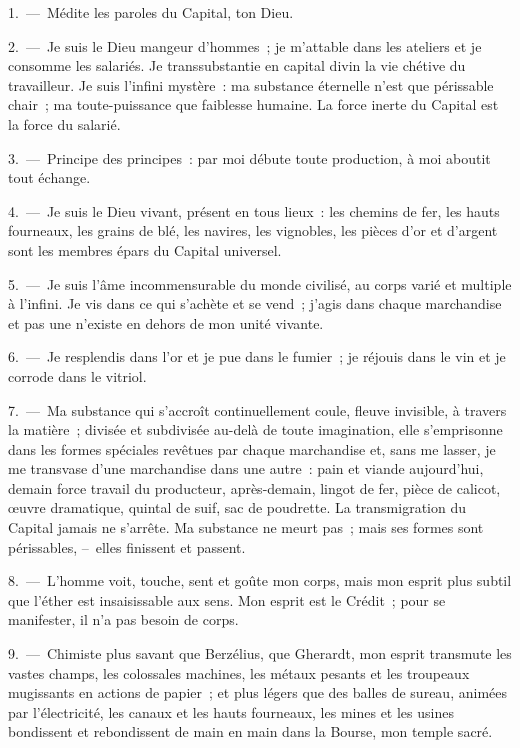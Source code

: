 \documentclass[french,twoside]{book} %
\begin{document}
1. — Médite les paroles du Capital, ton Dieu.\par
2. — Je suis le Dieu mangeur d’hommes ; je m’attable dans les ateliers et je consomme les salariés. Je transsubstantie en capital divin la vie chétive du travailleur. Je suis l’infini mystère : ma substance éternelle n’est que périssable chair ; ma toute-puissance que faiblesse humaine. La force inerte du Capital est la force du salarié.\par
3. — Principe des principes : par moi débute toute production, à moi aboutit tout échange.\par
4. — Je suis le Dieu vivant, présent en tous lieux : les chemins de fer, les hauts fourneaux, les grains de blé, les navires, les vignobles, les pièces d’or et d’argent sont les membres épars du Capital universel.\par
5. — Je suis l’âme incommensurable du monde civilisé, au corps varié et multiple à l’infini. Je vis dans ce qui s’achète et se vend ; j’agis dans chaque marchandise et pas une n’existe en dehors de mon unité vivante.\par
6. — Je resplendis dans l’or et je pue dans le fumier ; je réjouis dans le vin et je corrode dans le vitriol.\par
7. — Ma substance qui s’accroît continuellement coule, fleuve invisible, à travers la matière ; divisée et subdivisée au-delà de toute imagination, elle s’emprisonne dans les formes spéciales revêtues par chaque marchandise et, sans me lasser, je me transvase d’une marchandise dans une autre : pain et viande aujourd’hui, demain force travail du producteur, après-demain, lingot de fer, pièce de calicot, œuvre dramatique, quintal de suif, sac de poudrette. La transmigration du Capital jamais ne s’arrête. Ma substance ne meurt pas ; mais ses formes sont périssables, – elles finissent et passent.\par
8. — L'homme voit, touche, sent et goûte mon corps, mais mon esprit plus subtil que l’éther est insaisissable aux sens. Mon esprit est le Crédit ; pour se manifester, il n’a pas besoin de corps.\par
9. — Chimiste plus savant que Berzélius, que Gherardt, mon esprit transmute les vastes champs, les colossales machines, les métaux pesants et les troupeaux mugissants en actions de papier ; et plus légers que des balles de sureau, animées par l’électricité, les canaux et les hauts fourneaux, les mines et les usines bondissent et rebondissent de main en main dans la Bourse, mon temple sacré.\par
\end{document}
